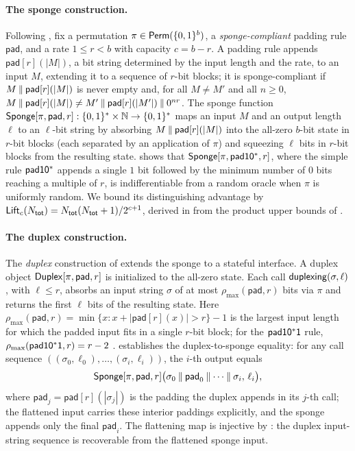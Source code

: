 \paragraph{The sponge construction.}
Following \cite{BDPV08}, fix a permutation $\pi \in \mathsf{Perm}(\{0,1\}^b)$, a
\emph{sponge-compliant} padding rule $\mathsf{pad}$, and a rate $1 \leq
r < b$ with capacity $c = b - r$. A padding rule appends
$\mathsf{pad}[r](|M|)$, a bit string determined by the input length and
the rate, to an input $M$, extending it to a sequence of $r$-bit
blocks; it is sponge-compliant
\cite[Definition~1]{BDPV11} if $M \mathbin{\|} \mathsf{pad}[r](|M|)$ is never
empty and, for all $M \neq M'$ and all $n \geq 0$, $M \mathbin{\|}
\mathsf{pad}[r](|M|) \neq M' \mathbin{\|} \mathsf{pad}[r](|M'|) \mathbin{\|}
0^{n r}$. The sponge function $\mathsf{Sponge}[\pi, \mathsf{pad}, r]
: \{0,1\}^* \times \mathbb{N} \to \{0,1\}^*$ maps an input $M$ and an output
length $\ell$ to an $\ell$-bit string by absorbing $M \mathbin{\|}
\mathsf{pad}[r](|M|)$ into the all-zero $b$-bit state in $r$-bit blocks
(each separated by an application of $\pi$) and squeezing $\ell$ bits in
$r$-bit blocks from the resulting state. \cite[Theorem~2]{BDPV08} shows that
$\mathsf{Sponge}[\pi, \mathsf{pad10^*}, r]$, where the simple rule $\mathsf{pad10^*}$ appends a
single $1$ bit followed by the minimum number of $0$ bits reaching a
multiple of $r$, is indifferentiable from a random oracle when
$\pi$ is uniformly random. We bound its distinguishing advantage by
$\mathsf{Lift}_c(N_{\mathsf{tot}}) = N_{\mathsf{tot}}(N_{\mathsf{tot}}+1) / 2^{c+1}$, derived in
 from the product upper bounds of
\cite[Lemmas~4 and~5]{BDPV08}.

\paragraph{The duplex construction.}
The \emph{duplex} construction of \cite{BDPV11} extends the sponge to
a stateful interface. A duplex object $\mathsf{Duplex}[\pi, \mathsf{pad}, r]$
is initialized to the all-zero state. Each call $\mathsf{duplexing}(\sigma,
\ell)$, with $\ell \leq r$, absorbs an input string $\sigma$ of at most
$\rho_{\max}(\mathsf{pad}, r)$ bits via $\pi$ and returns the first
$\ell$ bits of the resulting state. Here $\rho_{\max}(\mathsf{pad}, r)
= \min\{x : x + |\mathsf{pad}[r](x)| > r\} - 1$ is the largest input
length for which the padded input fits in a single $r$-bit block; for
the $\mathsf{pad10^*1}$ rule, $\rho_{\max}(\mathsf{pad10^*1}, r) = r - 2$
\cite{BDPV11}. \cite[Lemma~3]{BDPV11}
establishes the duplex-to-sponge equality: for any call
sequence $((\sigma_0, \ell_0), \dots, (\sigma_i, \ell_i))$, the $i$-th
output equals
\[
  \mathsf{Sponge}[\pi, \mathsf{pad}, r]\bigl(
    \sigma_0 \mathbin{\|} \mathsf{pad}_0 \mathbin{\|} \cdots \mathbin{\|} \sigma_i,\,
    \ell_i\bigr),
\]
where $\mathsf{pad}_j = \mathsf{pad}[r](|\sigma_j|)$ is the padding
the duplex appends in its $j$-th call; the flattened input carries
these interior paddings explicitly, and the sponge appends only the
final $\mathsf{pad}_i$. The flattening map is
injective by \cite[Lemma~4]{BDPV11}: the duplex input-string sequence is
recoverable from the flattened sponge input.

